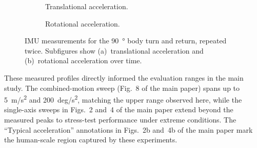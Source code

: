 \documentclass[fleqn,10pt]{article}
\begin{document}
\begin{figure}[h!]
    \centering
    \begin{subfigure}{0.99\linewidth}
        \centering
        
        \vspace{-34pt}
        \caption{Translational acceleration.}
    \end{subfigure}

    \begin{subfigure}{0.99\linewidth}
        \centering
        
        \vspace{-34pt}
        \caption{Rotational acceleration.}
    \end{subfigure}
    \caption{IMU measurements for the \SI{90}{\degree} body turn and return, repeated twice. Subfigures show (a)~translational acceleration and (b)~rotational acceleration over time.}
    \vspace{-5pt}
\end{figure}

These measured profiles directly informed the evaluation ranges in the main study. The combined-motion sweep (Fig.~8 of the main paper) spans up to \SI{5}{m/s^2} and \SI{200}{deg/s^2}, matching the upper range observed here, while the single-axis sweeps in Figs.~2 and~4 of the main paper extend beyond the measured peaks to stress-test performance under extreme conditions. The ``Typical acceleration'' annotations in Figs.~2b and~4b of the main paper mark the human-scale region captured by these experiments.
\end{document}
